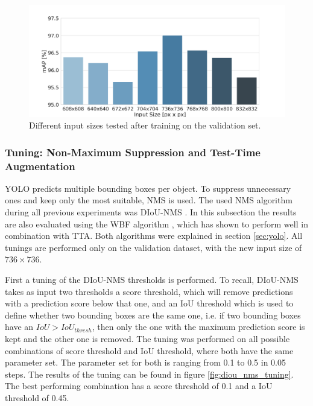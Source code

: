 \begin{figure}
\begin{center}
    \includegraphics[width=14cm]{imgs/yolo_input_size_tuning.pdf}
    \caption{Different input sizes tested after training on the validation set.}
    \label{fig:yolo_input_size}
\end{center}
\end{figure}

\subsubsection{Tuning: Non-Maximum Suppression and Test-Time Augmentation}

YOLO predicts multiple bounding boxes per object.
To suppress unnecessary ones and keep only the most suitable, \ac{NMS} is used.
The used \ac{NMS} algorithm during all previous experiments was \ac{DIoU}-\ac{NMS} \cite{diou}.
In this subsection the results are also evaluated using the \ac{WBF} algorithm \cite{weighted_bbox_fusion}, which has shown to perform well in combination with \ac{TTA}.
Both algorithms were explained in section \ref{sec:yolo}.
All tunings are performed only on the validation dataset, with the new input size of $736 \times 736$.

First a tuning of the \ac{DIoU}-\ac{NMS} thresholds is performed.
To recall, \ac{DIoU}-\ac{NMS} takes as input two thresholds a score threshold, which will remove predictions with a prediction score below that one, and an \ac{IoU} threshold which is used to define whether two bounding boxes are the same one, i.e. if two bounding boxes have an $IoU > IoU_{thresh}$, then only the one with the maximum prediction score is kept and the other one is removed.
The tuning was performed on all possible combinations of score threshold and \ac{IoU} threshold, where both have the same parameter set.
The parameter set for both is ranging from 0.1 to 0.5 in 0.05 steps.
The results of the tuning can be found in figure \ref{fig:diou_nms_tuning}.
The best performing combination has a score threshold of 0.1 and a \ac{IoU} threshold of 0.45.


